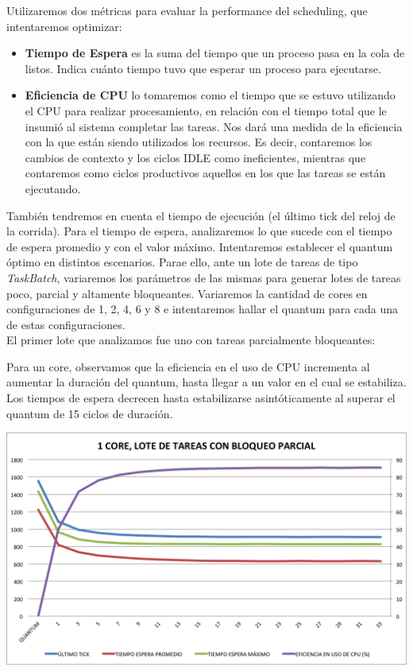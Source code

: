 \noindent
Utilizaremos dos métricas para evaluar la performance del scheduling, que intentaremos optimizar:
\begin{itemize}
	\item \textbf{Tiempo de Espera} es la suma del tiempo que un proceso pasa en la cola de listos. Indica cuánto tiempo tuvo que esperar un proceso para ejecutarse.
	\item \textbf{Eficiencia de CPU} lo tomaremos como el tiempo que se estuvo utilizando el CPU para realizar procesamiento, en relación con el tiempo total que le insumió al sistema completar las tareas. Nos dará una medida de la eficiencia con la que están siendo utilizados los recursos. Es decir, contaremos los cambios de contexto y los ciclos IDLE como ineficientes, mientras que contaremos como ciclos productivos aquellos en los que las tareas se están ejecutando.
\end{itemize}

Tambi\'en tendremos en cuenta el tiempo de ejecuci\'on (el \'ultimo tick del reloj de la corrida). Para el tiempo de espera, analizaremos lo que sucede con el tiempo de espera promedio y con el valor m\'aximo. Intentaremos establecer el quantum \'optimo en distintos escenarios. Parae ello, ante un lote de tareas de tipo \textit{TaskBatch}, variaremos los par\'ametros de las mismas para generar lotes de tareas poco, parcial y altamente bloqueantes. Variaremos la cantidad de cores en configuraciones de 1, 2, 4, 6 y 8 e intentaremos hallar el quantum para cada una de estas configuraciones. \\

El primer lote que analizamos fue uno con tareas parcialmente bloqueantes:


Para un core, observamos que la eficiencia en el uso de CPU incrementa al aumentar la duraci\'on del quantum, hasta llegar a un valor en el cual se estabiliza. Los tiempos de espera decrecen hasta estabilizarse asint\'oticamente al superar el quantum de 15 ciclos de duraci\'on.

\begin{center}
	\includegraphics[scale=0.4]{graficos/1core_loteNormal.png}
\end{center}

